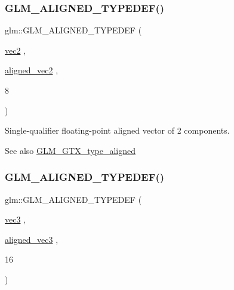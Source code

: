 \subsubsection{\texorpdfstring{G\+L\+M\+\_\+\+A\+L\+I\+G\+N\+E\+D\+\_\+\+T\+Y\+P\+E\+D\+E\+F()}{GLM\_ALIGNED\_TYPEDEF()}\hspace{0.1cm}{\footnotesize\ttfamily [144/209]}}
{\footnotesize\ttfamily glm\+::\+G\+L\+M\+\_\+\+A\+L\+I\+G\+N\+E\+D\+\_\+\+T\+Y\+P\+E\+D\+EF (\begin{DoxyParamCaption}\item[{\mbox{\hyperlink{group__core__types_gaa1618f51db67eaa145db101d8c8431d8}{vec2}}}]{,  }\item[{\mbox{\hyperlink{group__gtc__type__aligned_ga8f4a38f220c72d218dbdc7bc1d06a1a2}{aligned\+\_\+vec2}}}]{,  }\item[{8}]{ }\end{DoxyParamCaption})}

Single-\/qualifier floating-\/point aligned vector of 2 components. \begin{DoxySeeAlso}{See also}
\mbox{\hyperlink{group__gtx__type__aligned}{G\+L\+M\+\_\+\+G\+T\+X\+\_\+type\+\_\+aligned}} 
\end{DoxySeeAlso}
\mbox{\label{group__gtx__type__aligned_gab8d081fac3a38d6f55fa552f32168d32}} 
\subsubsection{\texorpdfstring{G\+L\+M\+\_\+\+A\+L\+I\+G\+N\+E\+D\+\_\+\+T\+Y\+P\+E\+D\+E\+F()}{GLM\_ALIGNED\_TYPEDEF()}\hspace{0.1cm}{\footnotesize\ttfamily [145/209]}}
{\footnotesize\ttfamily glm\+::\+G\+L\+M\+\_\+\+A\+L\+I\+G\+N\+E\+D\+\_\+\+T\+Y\+P\+E\+D\+EF (\begin{DoxyParamCaption}\item[{\mbox{\hyperlink{group__core__types_ga1c47e8b3386109bc992b6c48e91b0be7}{vec3}}}]{,  }\item[{\mbox{\hyperlink{group__gtc__type__aligned_ga9c54536a3becfd10a44f6b1b8c4aa3d3}{aligned\+\_\+vec3}}}]{,  }\item[{16}]{ }\end{DoxyParamCaption})}

